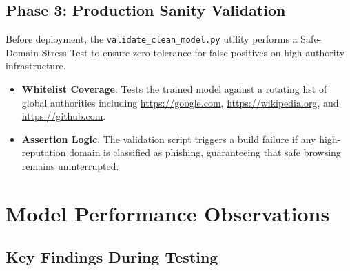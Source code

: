 \subsection*{Phase 3: Production Sanity Validation}
\noindent
Before deployment, the \texttt{validate\_clean\_model.py} utility performs a Safe-Domain Stress Test to ensure zero-tolerance for false positives on high-authority infrastructure.
\begin{itemize}
    \item \textbf{Whitelist Coverage}: Tests the trained model against a rotating list of global authorities including \url{https://google.com}, \url{https://wikipedia.org}, and \url{https://github.com}.
    \item \textbf{Assertion Logic}: The validation script triggers a build failure if any high-reputation domain is classified as phishing, guaranteeing that safe browsing remains uninterrupted.
\end{itemize}

\section{Model Performance Observations}

\subsection*{Key Findings During Testing}

